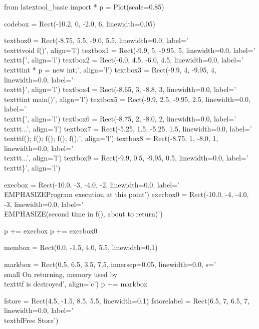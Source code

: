 \begin{python}
from latextool_basic import *
p = Plot(scale=0.85)

codebox = Rect(-10.2, 0, -2.0, 6, linewidth=0.05)

textbox0 = Rect(-8.75, 5.5, -9.0, 5.5, linewidth=0.0, label='\\texttt{void f()}', align='l')
textbox1 = Rect(-9.9, 5, -9.95, 5, linewidth=0.0, label='\\texttt{\{}', align='l')
textbox2 = Rect(-6.0, 4.5, -6.0, 4.5, linewidth=0.0, label='\\texttt{int * p = new int;}', align='l')
textbox3 = Rect(-9.9, 4, -9.95, 4, linewidth=0.0, label='\\texttt{\}}', align='l')
textbox4 = Rect(-8.65, 3, -8.8, 3, linewidth=0.0, label='\\texttt{int main()}', align='l')
textbox5 = Rect(-9.9, 2.5, -9.95, 2.5, linewidth=0.0, label='\\texttt{\{}', align='l')
textbox6 = Rect(-8.75, 2, -8.0, 2, linewidth=0.0, label='\\texttt{...}', align='l')
textbox7 = Rect(-5.25, 1.5, -5.25, 1.5, linewidth=0.0, label='\\texttt{f(); f(); f(); f(); f();}', align='l')
textbox8 = Rect(-8.75, 1, -8.0, 1, linewidth=0.0, label='\\texttt{...}', align='l')
textbox9 = Rect(-9.9, 0.5, -9.95, 0.5, linewidth=0.0, label='\\texttt{\}}', align='l')

execbox = Rect(-10.0, -3, -4.0, -2, linewidth=0.0,
               label='\\EMPHASIZE{Program execution at this point}')
execbox0 = Rect(-10.0, -4, -4.0, -3, linewidth=0.0,
               label='\\EMPHASIZE{(second time in f(), about to return)}')

p += execbox
p += execbox0

membox = Rect(0.0, -1.5, 4.0, 5.5, linewidth=0.1)

markbox = Rect(0.5, 6.5, 3.5, 7.5, innersep=0.05, linewidth=0.0, s='{\\small On returning, memory used by \\texttt{f} is destroyed}', align='c')
p += markbox

fstore = Rect(4.5, -1.5, 8.5, 5.5, linewidth=0.1)
fstorelabel = Rect(6.5, 7, 6.5, 7, linewidth=0.0, label='\\textbf{Free Store}')


\end{python}
